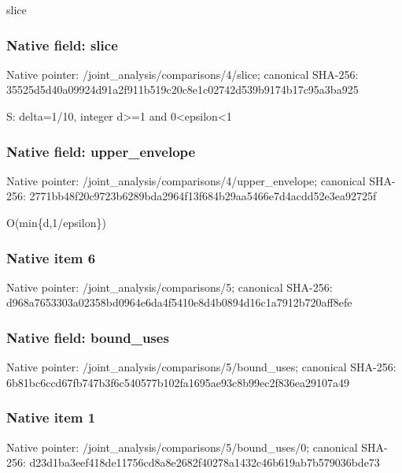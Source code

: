 \documentclass[10pt,a4paper]{article}
\begin{document}
\begingroup\raggedright\sloppy slice\par\endgroup

\subsubsection{Native field: slice}
Native pointer: /joint\_\allowbreak{}analysis/comparisons/4/slice; canonical SHA-256: 35525d5d40a09924d91a2f911b519c20c8e1c02742d539b9174b17c95a3ba925

\begingroup\raggedright\sloppy S:\allowbreak{} delta=\allowbreak{}1/\allowbreak{}10,\allowbreak{} integer d>=\allowbreak{}1 and 0<epsilon<1\par\endgroup

\subsubsection{Native field: upper\_\allowbreak{}envelope}
Native pointer: /joint\_\allowbreak{}analysis/comparisons/4/upper\_\allowbreak{}envelope; canonical SHA-256: 2771bb48f20c9723b6289bda2964f13f684b29aa5466e7d4acdd52e3ea92725f

\begingroup\raggedright\sloppy O(min\{d,\allowbreak{}1/\allowbreak{}epsilon\})\par\endgroup

\subsubsection{Native item 6}
Native pointer: /joint\_\allowbreak{}analysis/comparisons/5; canonical SHA-256: d968a7653303a02358bd0964e6da4f5410e8d4b0894d16c1a7912b720aff8efe

\subsubsection{Native field: bound\_\allowbreak{}uses}
Native pointer: /joint\_\allowbreak{}analysis/comparisons/5/bound\_\allowbreak{}uses; canonical SHA-256: 6b81bc6ccd67fb747b3f6c540577b102fa1695ae93c8b99ec2f836ea29107a49

\subsubsection{Native item 1}
Native pointer: /joint\_\allowbreak{}analysis/comparisons/5/bound\_\allowbreak{}uses/0; canonical SHA-256: d23d1ba3eef418de11756cd8a8e2682f40278a1432c46b619ab7b579036bde73
\end{document}

